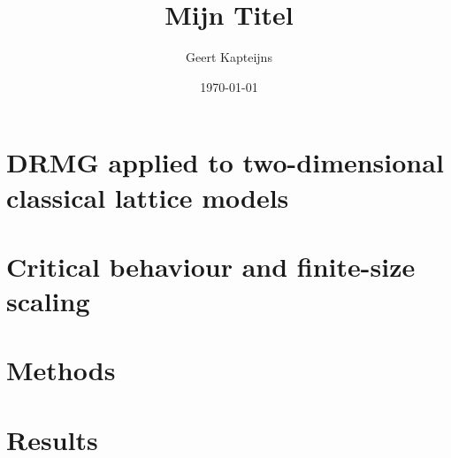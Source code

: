 \documentclass[9pt, ebook, openany, oneside]{memoir}
\renewcommand{\afterchaptertitle}{%
 \vskip2em
 \hrule height 0.6pt
 \vskip2em
 }
\begin{document}
\pagestyle{simple}



\frontmatter

\title{Mijn Titel}
\author{Geert Kapteijns}
\date{\today}


\begingroup
\renewcommand{\afterchaptertitle}{\vskip1.5em}

\tableofcontents*
\endgroup

\mainmatter

% 
% 
\chapter{DRMG applied to two-dimensional classical lattice models}

%
\chapter{Critical behaviour and finite-size scaling}

%

\chapter{Methods}


\chapter{Results}


% 
%
% 
%
% 

% 



\backmatter
\printbibliography
\end{document}
